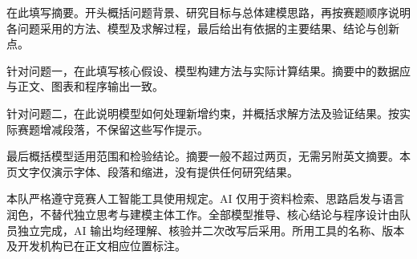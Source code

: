 在此填写摘要。开头概括问题背景、研究目标与总体建模思路，再按赛题顺序说明各问题采用的方法、模型及求解过程，最后给出有依据的主要结果、结论与创新点。

针对问题一，在此填写核心假设、模型构建方法与实际计算结果。摘要中的数据应与正文、图表和程序输出一致。

针对问题二，在此说明模型如何处理新增约束，并概括求解方法及验证结果。按实际赛题增减段落，不保留这些写作提示。

最后概括模型适用范围和检验结论。摘要一般不超过两页，无需另附英文摘要。本页文字仅演示字体、段落和缩进，没有提供任何研究结果。

本队严格遵守竞赛人工智能工具使用规定。AI 仅用于资料检索、思路启发与语言润色，不替代独立思考与建模主体工作。全部模型推导、核心结论与程序设计由队员独立完成，AI 输出均经理解、核验并二次改写后采用。所用工具的名称、版本及开发机构已在正文相应位置标注。

